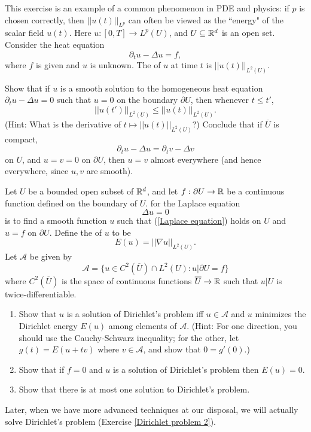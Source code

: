 \begin{exercise}
This exercise is an example of a common phenomenon in PDE and physics: if $p$ is chosen correctly, then $||u(t)||_{L^p}$ can often be viewed as the ``energy" of the scalar field $u(t)$. Here $u: [0, T] \to L^p(U)$, and $U \subseteq \mathbb{R}^d$ is an open set.
Consider the heat equation
\[\partial_t u - \Delta u = f,\]
where $f$ is given and $u$ is unknown. The  of $u$ at time $t$ is $||u(t)||_{L^2(U)}$.

Show that if $u$ is a smooth solution to the homogeneous heat equation $\partial_t u - \Delta u = 0$ such that $u = 0$ on the boundary $\partial U$, then whenever $t \leq t'$,
\[||u(t')||_{L^2(U)} \leq ||u(t)||_{L^2(U)}.\]
(Hint: What is the derivative of $t \mapsto ||u(t)||_{L^2(U)}$?)
Conclude that if $\overline U$ is compact,
\[\partial_t u - \Delta u = \partial_t v - \Delta v\]
on $U$, and $u = v = 0$ on $\partial U$, then $u = v$ almost everywhere (and hence everywhere, since $u,v$ are smooth).
\end{exercise}

\begin{exercise}
\label{Dirichlet problem}
Let $U$ be a bounded open subset of $\mathbb{R}^d$, and let $f: \partial U \to \mathbb{R}$ be a continuous function defined on the boundary of $U$.
 for the Laplace equation
\begin{equation}
\label{Laplace equation}
\Delta u = 0
\end{equation}
is to find a smooth function $u$ such that (\ref{Laplace equation}) holds on $U$ and $u = f$ on $\partial U$.
Define the  of $u$ to be
\[E(u) = ||\nabla u||_{L^2(U)}.\]
Let $\mathcal A$ be given by
\[\mathcal A = \{u \in C^2(\overline U) \cap L^2(U): u|\partial U = f\}\]
where $C^2(\overline U)$ is the space of continuous functions $\overline U \to \mathbb{R}$ such that $u|U$ is twice-differentiable.
\begin{enumerate}
\item Show that $u$ is a solution of Dirichlet's problem iff $u \in \mathcal A$ and $u$ minimizes the Dirichlet energy $E(u)$ among elements of $\mathcal A$.
(Hint: For one direction, you should use the Cauchy-Schwarz inequality; for the other, let $g(t) = E(u + tv)$ where $v \in \mathcal A$, and show that $0 = g'(0)$.)
\item Show that if $f = 0$ and $u$ is a solution of Dirichlet's problem then $E(u) = 0$.
\item Show that there is at most one solution to Dirichlet's problem.
\end{enumerate}
Later, when we have more advanced techniques at our disposal, we will actually solve Dirichlet's problem (Exercise \ref{Dirichlet problem 2}).
\end{exercise}

